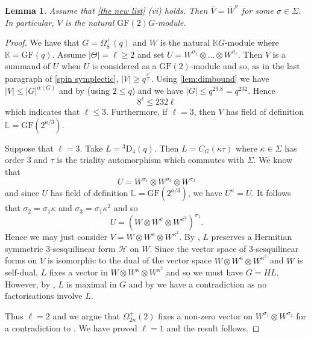 \documentclass[12pt]{amsart}
\newtheorem{lemma}[theorem]{Lemma}
\theoremstyle{remark}
\theoremstyle{notation}
\theoremstyle{definition}
\newcommand{\GF}{\mathrm{GF}}
\newcommand{\0}{\emptyset}
\begin{document}
\begin{lemma}\label{OrthRed}
Assume that \cref{the new list} (vi) holds. Then $\overline V=\overline W^{\sigma}$ for some $\sigma\in \Sigma$.  In particular, $V$ is the natural   $\GF(2)G$-module.
\end{lemma}

\begin{proof}
We have that $G =\Omega_8^+(q)$ and  $W$ is the natural   $\mathbb KG$-module where $\mathbb K=\GF(q)$.  Assume $|\Theta|=\ell\ge 2$ and set
$U= W^{\sigma_1} \otimes \dots\otimes W^{\sigma_\ell}$. Then $V$ is a summand of $U$ when $U$ is considered as a $\GF(2)$-module and so, as in the last paragraph of \cref{spin symplectic}, $|V|\ge  q^{\frac{8^\ell}{\ell}}$. Using \cref{lem:dimbound} we have $|V|\le |G|^{\alpha(G)}$ and by \cite[Corollary 16]{ParkerWilson} (using  $2\le q$)
  and \cite[Theorem 4.2]{GuralnickSaxl} we have $|G| \le q^{ 29.8}= q^{232}.$
Hence $$8^\ell \le 232\ell$$ which indicates that $\ell \le 3$. Furthermore, if $\ell=3$, then $V$ has field of definition $\mathbb L=\GF(2^{a/3})$.

Suppose that $\ell=3$.  Take $L={}^3\mathrm D_4(q)$. Then $L= C_G(\kappa \tau)$ where $\kappa \in \Sigma$ has order $3$ and $\tau$ is the triality automorphism which commutes with $\Sigma$.
We know that $$U= W^{\sigma_1}\otimes W^{\sigma_2}\otimes W^{\sigma_3}$$ and since $U$ has   field of definition $\mathbb L=\GF(2^{a/3})$, we have $U^\kappa=U$. It follows that $\sigma_2=\sigma_1\kappa$ and $\sigma_3=\sigma_1\kappa^2$ and so $$U= (W\otimes W^\kappa \otimes W^{\kappa^2})^{\sigma_1}.$$ Hence we may just consider $V=W\otimes W^\kappa \otimes W^{\kappa^2}$. By   \cite[(6.1)]{AschbacherMultLin}, $L$ preserves a Hermitian symmetric $3$-sesquilinear form $\mathcal H$ on $W$. Since the vector space of $3$-sesquilinear forms on $V$ is isomorphic to the dual of the vector  space $W\otimes W^\kappa \otimes W^{\kappa^2}$ and $W$ is self-dual, $L$ fixes a vector in $W\otimes W^\kappa \otimes W^{\kappa^2}$ \cite[Proposition 1.3', page 14]{Yokonuma} and so we must have $G=HL$. However, by \cite[Table 8.50]{BHRoney}, $L$ is maximal in $G$ and by \cite[Theorem A, Table 4]{LiebeckPraegerSaxl} we have a contradiction as no factorisations involve $L$.

Thus $\ell=2$ and we argue that $\Omega_{2n}^+(2)$ fixes a non-zero vector on $W^{\sigma_1}\otimes W^{\sigma_2}$ for a contradiction to \cite[Theorem A, Table 4  ]{LiebeckPraegerSaxl}. We have proved $\ell=1$ and the result follows.
\end{proof}
\end{document}
